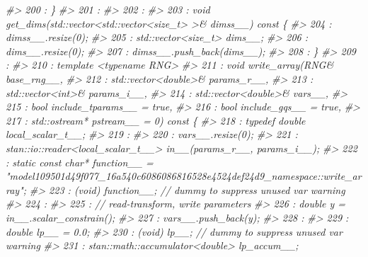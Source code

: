 \documentclass[
  10pt,
  italian,
  a4paper,
  extrafontsizes,onecolumn,openright
  ]{memoir}
\newenvironment{Shaded}{\begin{snugshade}}{\end{snugshade}}
\newcommand{\CommentTok}[1]{\textcolor[rgb]{0.56,0.35,0.01}{\textit{#1}}}
\begin{document}
\begin{Shaded}
\begin{Highlighting}[]
\CommentTok{\#\textgreater{}  200 :     \}}
\CommentTok{\#\textgreater{}  201 : }
\CommentTok{\#\textgreater{}  202 : }
\CommentTok{\#\textgreater{}  203 :     void get\_dims(std::vector\textless{}std::vector\textless{}size\_t\textgreater{} \textgreater{}\& dimss\_\_) const \{}
\CommentTok{\#\textgreater{}  204 :         dimss\_\_.resize(0);}
\CommentTok{\#\textgreater{}  205 :         std::vector\textless{}size\_t\textgreater{} dims\_\_;}
\CommentTok{\#\textgreater{}  206 :         dims\_\_.resize(0);}
\CommentTok{\#\textgreater{}  207 :         dimss\_\_.push\_back(dims\_\_);}
\CommentTok{\#\textgreater{}  208 :     \}}
\CommentTok{\#\textgreater{}  209 : }
\CommentTok{\#\textgreater{}  210 :     template \textless{}typename RNG\textgreater{}}
\CommentTok{\#\textgreater{}  211 :     void write\_array(RNG\& base\_rng\_\_,}
\CommentTok{\#\textgreater{}  212 :                      std::vector\textless{}double\textgreater{}\& params\_r\_\_,}
\CommentTok{\#\textgreater{}  213 :                      std::vector\textless{}int\textgreater{}\& params\_i\_\_,}
\CommentTok{\#\textgreater{}  214 :                      std::vector\textless{}double\textgreater{}\& vars\_\_,}
\CommentTok{\#\textgreater{}  215 :                      bool include\_tparams\_\_ = true,}
\CommentTok{\#\textgreater{}  216 :                      bool include\_gqs\_\_ = true,}
\CommentTok{\#\textgreater{}  217 :                      std::ostream* pstream\_\_ = 0) const \{}
\CommentTok{\#\textgreater{}  218 :         typedef double local\_scalar\_t\_\_;}
\CommentTok{\#\textgreater{}  219 : }
\CommentTok{\#\textgreater{}  220 :         vars\_\_.resize(0);}
\CommentTok{\#\textgreater{}  221 :         stan::io::reader\textless{}local\_scalar\_t\_\_\textgreater{} in\_\_(params\_r\_\_, params\_i\_\_);}
\CommentTok{\#\textgreater{}  222 :         static const char* function\_\_ = "model109501d49f077\_16a540c6086086816528e4524def24d9\_namespace::write\_array";}
\CommentTok{\#\textgreater{}  223 :         (void) function\_\_;  // dummy to suppress unused var warning}
\CommentTok{\#\textgreater{}  224 : }
\CommentTok{\#\textgreater{}  225 :         // read{-}transform, write parameters}
\CommentTok{\#\textgreater{}  226 :         double y = in\_\_.scalar\_constrain();}
\CommentTok{\#\textgreater{}  227 :         vars\_\_.push\_back(y);}
\CommentTok{\#\textgreater{}  228 : }
\CommentTok{\#\textgreater{}  229 :         double lp\_\_ = 0.0;}
\CommentTok{\#\textgreater{}  230 :         (void) lp\_\_;  // dummy to suppress unused var warning}
\CommentTok{\#\textgreater{}  231 :         stan::math::accumulator\textless{}double\textgreater{} lp\_accum\_\_;}

\end{Highlighting}
\end{Shaded}
\end{document}
